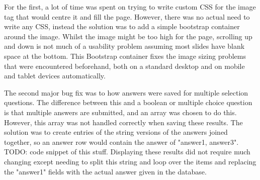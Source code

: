 \documentclass{article}
\begin{document}
For the first, a lot of time was spent on trying to write custom CSS for the image tag that would centre it and fill the page. However, there was no actual need to write any CSS, instead the solution was to add a simple bootstrap container around the image. Whilst the image might be too high for the page, scrolling up and down is not much of a usability problem assuming most slides have blank space at the bottom. This Bootstrap container fixes the image sizing problems that were encountered beforehand, both on a standard desktop and on mobile and tablet devices automatically.

The second major bug fix was to how answers were saved for multiple selection questions. The difference between this and a boolean or multiple choice question is that multiple answers are submitted, and an array was chosen to do this. However, this array was not handled correctly when saving these results. The solution was to create entries of the string versions of the answers joined together, so an answer row would contain the answer of "answer1, answer3". TODO: code snippet of this stuff. Displaying these results did not require much changing except needing to split this string and loop over the items and replacing the "answer1" fields with the actual answer given in the database.
\newpage

%
%
\end{document}
